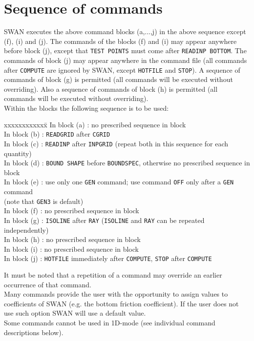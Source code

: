\documentclass[12pt]{book}
\begin{document}
\section{Sequence of commands} \label{sec:seqcomm}
SWAN executes the above command blocks (a,...,j) in the above sequence except (f), (i) and (j). The
commands of the blocks (f) and (i) may appear anywhere before block (j), except that {\tt TEST POINTS} must
come after {\tt READINP BOTTOM}. The commands of block (j) may appear anywhere in the command file (all
commands after {\tt COMPUTE} are ignored by SWAN, except {\tt HOTFILE} and {\tt STOP}). A sequence of
commands of block (g) is permitted (all commands will be executed without overriding). Also a sequence of
commands of block (h) is permitted (all commands will be executed without overriding).
\\[2ex]
\noindent
Within the blocks the following sequence is to be used:
\begin{tabbing}
xxxxxxxxxxxx\= \kill
{In block (a)} \>: no prescribed sequence in block\\
{In block (b)} \>: {\tt READGRID} after {\tt CGRID}\\
{In block (c)} \>: {\tt READINP} after {\tt INPGRID} (repeat both in this sequence for each quantity)\\
{In block (d)} \>: {\tt BOUND SHAPE} before {\tt BOUNDSPEC}, otherwise no prescribed sequence in block\\
{In block (e)} \>: use only one {\tt GEN} command; use command {\tt OFF} only after a {\tt GEN} command\+\\
                   (note that {\tt GEN3} is default)\-\\
{In block (f)} \>: no prescribed sequence in block\\
{In block (g)} \>: {\tt ISOLINE} after {\tt RAY} ({\tt ISOLINE} and {\tt RAY} can be repeated independently)\\
{In block (h)} \>: no prescribed sequence in block\\
{In block (i)} \>: no prescribed sequence in block\\
{In block (j)} \>: {\tt HOTFILE} immediately after {\tt COMPUTE}, {\tt STOP} after {\tt COMPUTE}\\
\end{tabbing}
It must be noted that a repetition of a command may override an earlier occurrence of that command.
\\[2ex]
\noindent
Many commands provide the user with the opportunity to assign values to coefficients of SWAN (e.g. the
bottom friction coefficient). If the user does not use such option SWAN will use a default value.
\\[2ex]
\noindent
Some commands cannot be used in 1D-mode (see individual command descriptions below).
\end{document}
